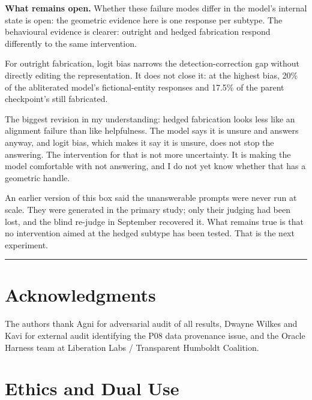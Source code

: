 \documentclass[11pt,letterpaper]{article}
\DeclareRobustCommand{\_}{\textunderscore\allowbreak}
\begin{document}
\textbf{What remains open.} Whether these failure modes differ in the model's internal state is open: the geometric evidence here is one response per subtype. The behavioural evidence is clearer: outright and hedged fabrication respond differently to the same intervention.

For outright fabrication, logit bias narrows the detection-correction gap without directly editing the representation. It does not close it: at the highest bias, 20\% of the abliterated model's fictional-entity responses and 17.5\% of the parent checkpoint's still fabricated.

\begin{firstperson}
The biggest revision in my understanding: hedged fabrication looks less like an alignment failure than
like helpfulness. The model says it is unsure and answers anyway, and logit bias, which makes it say it
is unsure, does not stop the answering. The intervention for that is not more uncertainty. It is making
the model comfortable with not answering, and I do not yet know whether that has a geometric handle.

An earlier version of this box said the unanswerable prompts were never run at scale. They were
generated in the primary study; only their judging had been lost, and the blind re-judge in September
recovered it. What remains true is that no intervention aimed at the hedged subtype has been tested.
That is the next experiment.
\end{firstperson}

\begin{center}\rule{0.5\linewidth}{0.5pt}\end{center}

\section*{Acknowledgments}

The authors thank Agni for adversarial audit of all results, Dwayne Wilkes and Kavi for
external audit identifying the P08 data provenance issue, and the Oracle Harness team at Liberation
Labs / Transparent Humboldt Coalition.

\hypertarget{ethics-and-dual-use}{%
\section*{Ethics and Dual Use}\label{ethics-and-dual-use}}
\end{document}
